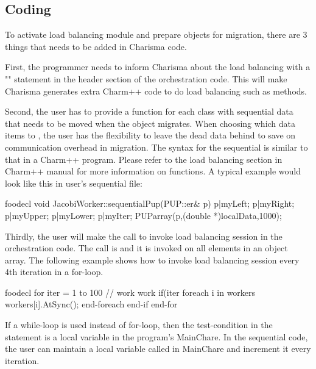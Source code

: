 \subsection{Coding}

To activate load balancing module and prepare objects for migration, there are 3
things that needs to be added in Charisma code. 

First, the programmer needs to inform Charisma about the load balancing with a
"" statement in the header section of the orchestration code.
This will make Charisma generates extra Charm++ code to do load balancing such
as  methods.

Second, the user has to provide a  function for each class with
sequential data that needs to be moved when the object migrates. When choosing
which data items to , the user has the flexibility to leave the dead
data behind to save on communication overhead in migration. The syntax for the
sequential  is similar to that in a Charm++ program. Please refer to
the load balancing section in Charm++ manual for more information on 
functions. A typical example would look like this in user's sequential 
file: 

\begin{SaveVerbatim}{foodecl}
  void JacobiWorker::sequentialPup(PUP::er& p){
    p|myLeft; p|myRight; p|myUpper; p|myLower;
    p|myIter;
    PUParray(p,(double *)localData,1000);
  }
\end{SaveVerbatim}

Thirdly, the user will make the call to invoke load balancing session in the
orchestration code. The call is  and it is invoked on all
elements in an object array. The following example shows how to invoke load
balancing session every 4th iteration in a for-loop. 

\begin{SaveVerbatim}{foodecl}
  for iter = 1 to 100
    // work work
    if(iter %
      foreach i in workers
        workers[i].AtSync();
      end-foreach
    end-if
  end-for
\end{SaveVerbatim}

If a while-loop is used instead of for-loop, then the test-condition in the
 statement is a local variable in the program's MainChare. In the
sequential code, the user can maintain a local variable called  in
MainChare and increment it every iteration. 


